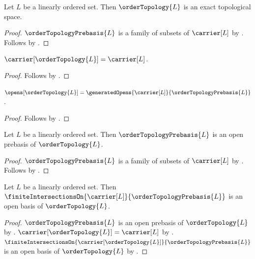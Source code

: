 \begin{theorem}\label{order_topology_is_exact}
    Let $L$ be a linearly ordered set.
    Then $\orderTopology{L}$ is an exact topological space.
\end{theorem}
\begin{proof}
    $\orderTopologyPrebasis{L}$ is a family of subsets of $\carrier[L]$
        by .
    Follows by .
\end{proof}

\begin{proposition}\label{order_topology_carrier}
    $\carrier[\orderTopology{L}]=\carrier[L]$.
\end{proposition}
\begin{proof}
    Follows by
        .
\end{proof}

\begin{proposition}\label{order_topology_opens}
    $\opens[\orderTopology{L}]
        =\generatedOpens{\carrier[L]}{\orderTopologyPrebasis{L}}$.
\end{proposition}
\begin{proof}
    Follows by
        .
\end{proof}

\begin{theorem}\label{order_topology_prebasis_is_open_prebasis}
    Let $L$ be a linearly ordered set.
    Then $\orderTopologyPrebasis{L}$ is an open prebasis of
        $\orderTopology{L}$.
\end{theorem}
\begin{proof}
    $\orderTopologyPrebasis{L}$ is a family of subsets of $\carrier[L]$
        by .
    Follows by
        .
\end{proof}

\begin{theorem}\label{order_topology_finite_intersections_are_open_basis}
    Let $L$ be a linearly ordered set.
    Then
        $\finiteIntersectionsOn{\carrier[L]}{\orderTopologyPrebasis{L}}$
        is an open basis of $\orderTopology{L}$.
\end{theorem}
\begin{proof}
    $\orderTopologyPrebasis{L}$ is an open prebasis of
        $\orderTopology{L}$ by
        .
    $\carrier[\orderTopology{L}]=\carrier[L]$ by
        .
    $\finiteIntersectionsOn{\carrier[\orderTopology{L}]}
        {\orderTopologyPrebasis{L}}$ is an open basis of
        $\orderTopology{L}$ by
        .
\end{proof}

